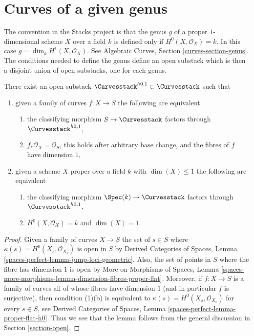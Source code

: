 \section{Curves of a given genus}
\label{section-genus}

\noindent
The convention in the Stacks project is that the genus $g$ of a
proper $1$-dimensional scheme $X$ over a field $k$ is defined only
if $H^0(X, \mathcal{O}_X) = k$. In this case
$g = \dim_k H^1(X, \mathcal{O}_X)$.
See Algebraic Curves, Section \ref{curves-section-genus}.
The conditions needed to define the genus define an open substack
which is then a disjoint union of open substacks, one for each genus.

\begin{lemma}
\label{lemma-pre-genus-curves}
There exist an open substack $\Curvesstack^{h0, 1} \subset \Curvesstack$
such that
\begin{enumerate}
\item given a family of curves $f : X \to S$ the following are equivalent
\begin{enumerate}
\item the classifying morphism $S \to \Curvesstack$ factors
through $\Curvesstack^{h0, 1}$,
\item $f_*\mathcal{O}_X = \mathcal{O}_S$, this holds
after arbitrary base change, and the fibres of $f$ have dimension $1$,
\end{enumerate}
\item given a scheme $X$ proper over a field $k$ with $\dim(X) \leq 1$
the following are equivalent
\begin{enumerate}
\item the classifying morphism $\Spec(k) \to \Curvesstack$ factors
through $\Curvesstack^{h0, 1}$,
\item $H^0(X, \mathcal{O}_X) = k$ and $\dim(X) = 1$.
\end{enumerate}
\end{enumerate}
\end{lemma}

\begin{proof}
Given a family of curves $X \to S$ the set of $s \in S$ where
$\kappa(s) = H^0(X_s, \mathcal{O}_{X_s})$
is open in $S$ by Derived Categories of Spaces, Lemma
\ref{spaces-perfect-lemma-jump-loci-geometric}.
Also, the set of points in $S$ where the fibre has
dimension $1$ is open by More on Morphisms of Spaces, Lemma
\ref{spaces-more-morphisms-lemma-dimension-fibres-proper-flat}.
Moreover, if $f : X \to S$ is a family of curves all of whose fibres
have dimension $1$ (and in particular $f$ is surjective), then
condition (1)(b) is equivalent to
$\kappa(s) = H^0(X_s, \mathcal{O}_{X_s})$ for every $s \in S$, see
Derived Categories of Spaces, Lemma \ref{spaces-perfect-lemma-proper-flat-h0}.
Thus we see that the lemma follows from the general discussion in
Section \ref{section-open}.
\end{proof}

